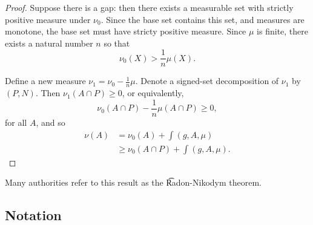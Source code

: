\begin{proposition}
\begin{proof}
Suppose there is a gap: then there exists a measurable set with strictly positive measure under $\nu _0$.
Since the base set contains this set, and measures are monotone, the base set must have stricty positive measure.
Since $\mu $ is finite, there exists a natural number $n$ so that
  \[
\nu _0(X) > \frac{1}{n}\mu (X).
  \]

Define a new measure $\nu _1 = \nu _0 - \frac{1}{n}\mu $.
Denote a signed-set decomposition of $\nu _1$
by $(P, N)$.
Then $\nu _1(A \cap P) \geq 0$, or equivalently,
  \[
\nu _0(A \cap P) - \frac{1}{n}\mu (A \cap P) \geq 0,
  \]
for all $A$, and so
  \[
\begin{aligned}
\nu (A) &= \nu _0(A) + \int(g, A, \mu ) \\
&\geq \nu _0(A \cap P) + \int (g, A, \mu ).
\end{aligned}
  \]
\end{proof}
\end{proposition}

Many authorities refer to this result as the \t{Radon-Nikodym theorem}.

\subsection*{Notation}
